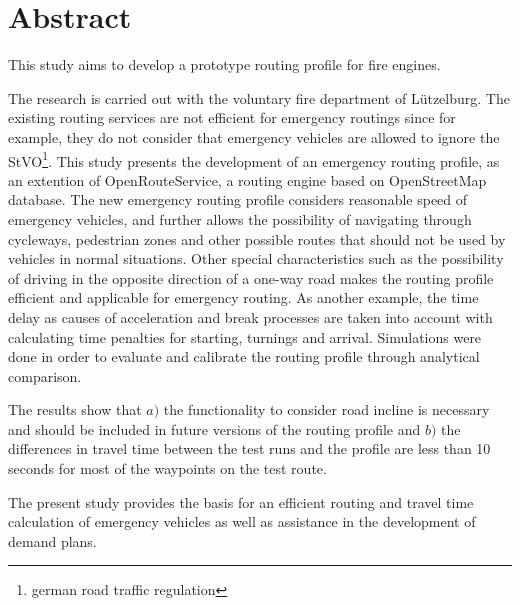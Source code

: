 {\centering\section*{Abstract}}

\vspace{1cm}

This study aims to develop a prototype routing profile for fire engines.
\medskip

The research is carried out with the voluntary fire department of Lützelburg.
The existing routing services are not efficient for emergency routings since for example, they do not consider that emergency vehicles are allowed to ignore the StVO\footnote{german road traffic regulation}.
This study presents the development of an emergency routing profile, as an extention of OpenRouteService, a routing engine based on OpenStreetMap database.
The new emergency routing profile considers reasonable speed of emergency vehicles, and further allows the possibility of navigating through cycleways, pedestrian zones and other possible routes that should not be used by vehicles in normal situations.
Other special characteristics such as the possibility of driving in the opposite direction of a one-way road makes the routing profile efficient and applicable for emergency routing.
As another example, the time delay as causes of acceleration and break processes are taken into account with calculating time penalties for starting, turnings and arrival.
Simulations were done in order to evaluate and calibrate the routing profile through analytical comparison.\par
The results show that \newline $a)$ the functionality to consider road incline is necessary and should be included in future versions of the routing profile and \newline $b)$ the differences in travel time between the test runs and the profile are less than 10 seconds for most of the waypoints on the test route.
\bigskip

The present study provides the basis for an efficient routing and travel time calculation of emergency vehicles as well as assistance in the development of demand plans.